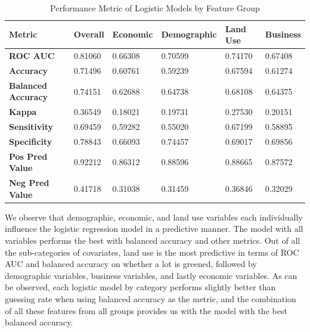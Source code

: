 \documentclass{article}
\begin{document}
\begin{table}[H]
\begin{center}
\caption{\label{tab:perfm}Performance Metric of Logistic Models by Feature Group}
\begin{tabular}{@{}llllll@{}}
\toprule
\textbf{Metric}               & \textbf{Overall} & \textbf{Economic} & \textbf{Demographic} & \textbf{Land Use} & \textbf{Business} \\ \midrule
\textbf{ROC AUC}              & 0.81060          & 0.66308           & 0.70599              & 0.74170           & 0.67408           \\
\textbf{Accuracy}             & 0.71496          & 0.60761           & 0.59239              & 0.67594           & 0.61274           \\
\textbf{Balanced Accuracy}    & 0.74151          & 0.62688           & 0.64738              & 0.68108           & 0.64375           \\
\textbf{Kappa}                & 0.36549          & 0.18021           & 0.19731              & 0.27530           & 0.20151           \\
\textbf{Sensitivity}          & 0.69459          & 0.59282           & 0.55020              & 0.67199           & 0.58895           \\
\textbf{Specificity}          & 0.78843          & 0.66093           & 0.74457              & 0.69017           & 0.69856           \\
\textbf{Pos Pred Value}       & 0.92212          & 0.86312           & 0.88596              & 0.88665           & 0.87572           \\
\textbf{Neg Pred Value}       & 0.41718          & 0.31038           & 0.31459              & 0.36846           & 0.32029           \\
 \bottomrule
\end{tabular}
\end{center}
\end{table}

We observe that demographic, economic, and land use variables each individually influence the logistic regression model in a predictive manner. The model with all variables performs the best with balanced accuracy and other metrics. Out of all the sub-categories of covariates, land use is the most predictive in terms of ROC AUC and balanced accuracy on whether a lot is greened, followed by demographic variables, business variables, and lastly economic variables. As can be observed, each logistic model by category performs slightly better than guessing rate when using balanced accuracy as the metric, and the combination of all these features from all groups provides us with the model with the best balanced accuracy.
\end{document}
